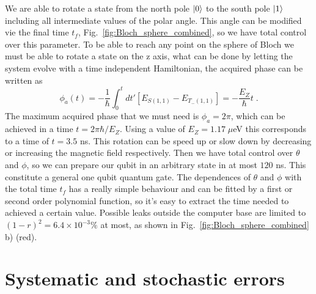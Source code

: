 We are able to rotate a state from the north pole $\ket{0}$ to the south pole $\ket{1}$ including all intermediate values of the polar angle. This angle can be modified vie the final time $t_f$, Fig.~\ref{fig:Bloch_sphere_combined}, so we have total control over this parameter. To be able to reach any point on the sphere of Bloch we must be able to rotate a state on the z axis, what can be done by letting the system evolve with a time independent Hamiltonian, the acquired phase can be written as
\begin{equation}
	\phi_a(t)=-\frac{1}{\hbar}\int_0^t dt'[E_{S(1,1)}-E_{T_-(1,1)}]=-\frac{E_Z}{\hbar}t\; .
\end{equation}
The maximum acquired phase that we must need is $\phi_a=2\pi$, which can be achieved in a time $t=2\pi\hbar/E_Z$. Using a value of $E_Z=1.17\; \mu$eV this corresponds to a time of $t=3.5$ ns. This rotation can be speed up or slow down by decreasing or increasing the magnetic field respectively. Then we have total control over $\theta$ and $\phi$, so we can prepare our qubit in an arbitrary state in at most $120$ ns. This constitute a general one qubit quantum gate. The dependences of $\theta$ and $\phi$ with the total time $t_f$ has a really simple behaviour and can be fitted by a first or second order polynomial function, so it's easy to extract the time needed to achieved a certain value. Possible leaks outside the computer base are limited to $(1-r)^2=6.4\times10^{-3}\%$ at most, as shown in Fig.~\ref{fig:Bloch_sphere_combined} b) (red).
\section{Systematic and stochastic errors}


